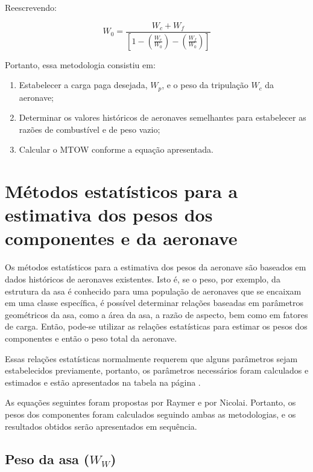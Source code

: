   Reescrevendo:

  \begin{equation}
    W_0 =
    \frac
      {W_c + W_f}
      {\left[
        1 -
        \left( \frac{W_e}{W_0} \right) -
        \left( \frac{W_f}{W_0} \right)
      \right]}
  \end{equation}

  Portanto, essa metodologia consistiu em:

  \begin{enumerate}
    \item Estabelecer a carga paga desejada, $W_p$, e o peso da tripulação $W_c$ da aeronave;
    \item Determinar os valores históricos de aeronaves semelhantes para estabelecer as razões de combustível e de peso vazio;
    \item Calcular o MTOW conforme a equação apresentada.
  \end{enumerate}


\section{Métodos estatísticos para a estimativa dos pesos dos componentes e da aeronave}

  Os métodos estatísticos para a estimativa dos pesos da aeronave são baseados em dados históricos de aeronaves existentes.
  Isto é, se o peso, por exemplo, da estrutura da asa é conhecido para uma população de aeronaves que se encaixam em uma classe específica, é possível determinar relações baseadas em parâmetros geométricos da asa, como a área da asa, a razão de aspecto, bem como em fatores de carga.
  Então, pode-se utilizar as relações estatísticas para estimar os pesos dos componentes e então o peso total da aeronave.

  Essas relações estatísticas normalmente requerem que alguns parâmetros sejam estabelecidos previamente, portanto, os parâmetros necessários foram calculados e estimados e estão apresentados na tabela na página \pageref{tbl:estimativasPeso}.

  As equações seguintes foram propostas por Raymer e por Nicolai.
	Portanto, os pesos dos componentes foram calculados seguindo ambas as metodologias, e os resultados obtidos serão apresentados em sequência.

  \subsection{Peso da asa ($W_W$)}


